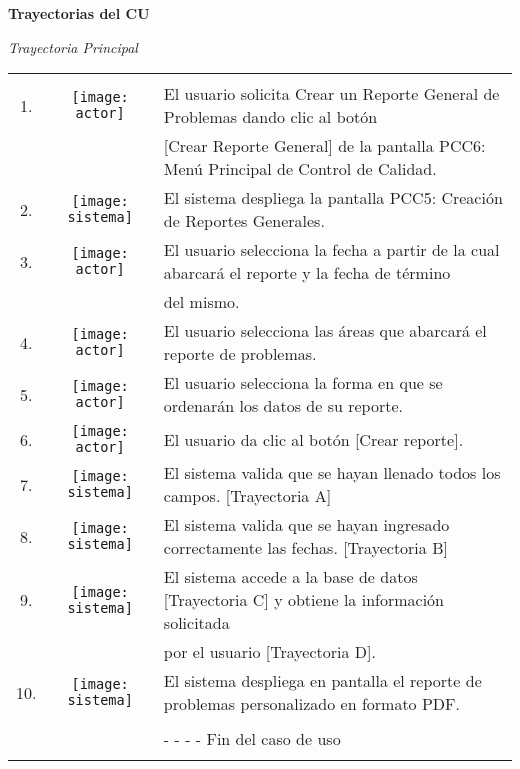 \documentclass[10pt,spanish]{article}
\providecommand{\tabularnewline}{\\}
\begin{document}
	\newpage
	\textbf{\large Trayectorias del CU\\}{\large \par}
	\textit{\large Trayectoria Principal}{\large{} }{\large \par}
	\begin{tabular}{ccl}
	 &  & \tabularnewline
	1. & \texttt{[image: actor]} & El usuario solicita Crear un Reporte General de Problemas dando clic al botón   \tabularnewline
	& &  [Crear Reporte General] de la pantalla PCC6: Menú Principal de Control de Calidad.\tabularnewline

	2. & \texttt{[image: sistema]} &  El sistema despliega la pantalla PCC5: Creación de Reportes Generales.\tabularnewline
	
	3. & \texttt{[image: actor]} & El usuario selecciona la fecha a partir de la cual abarcará el reporte y la fecha de término \tabularnewline
	&  & del mismo.\tabularnewline
	
	4. & \texttt{[image: actor]} & El usuario selecciona las áreas que abarcará el reporte de problemas.\tabularnewline 

	5. & \texttt{[image: actor]} & El usuario selecciona la forma en que se ordenarán los datos de su reporte.  \tabularnewline
	
	6. & \texttt{[image: actor]} & El usuario da clic al botón [Crear reporte]. \tabularnewline	
	
	7. & \texttt{[image: sistema]} & El sistema valida que se hayan llenado todos los campos. [Trayectoria A] \tabularnewline
	
	8. & \texttt{[image: sistema]} & El sistema valida que se hayan ingresado correctamente las fechas. [Trayectoria B] \tabularnewline	

    9. & \texttt{[image: sistema]} & El sistema accede a la base de datos [Trayectoria C] y obtiene la información solicitada \tabularnewline
    & & por el usuario [Trayectoria D].   \tabularnewline	

    10. & \texttt{[image: sistema]} & El sistema despliega en pantalla el reporte de problemas personalizado en formato PDF.       \tabularnewline
	
	\tabularnewline
	 &  & - - - - Fin del caso de uso\tabularnewline \\
	\end{tabular}
\end{document}
